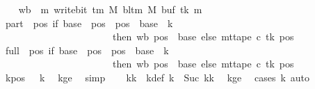 \begin{isabellebody}
\ \ \isamarkupfalse%
\ {\isacharquery}{\kern0pt}wb\ {\isacharequal}{\kern0pt}\ {\isachardoublequoteopen}{\isasymlambda}m{\isachardot}{\kern0pt}\ write{\isacharunderscore}{\kern0pt}bit\ {\isacharparenleft}{\kern0pt}{\isasymGamma}{\isacharunderscore}{\kern0pt}tm\ M{\isacharparenright}{\kern0pt}\ {\isacharparenleft}{\kern0pt}bl{\isacharunderscore}{\kern0pt}tm\ M{\isacharparenright}{\kern0pt}\ {\isacharparenleft}{\kern0pt}buf\ tk{\isacharparenright}{\kern0pt}\ m{\isachardoublequoteclose}\isanewline
\ \ \isamarkupfalse%
\ {\isacharquery}{\kern0pt}part\ {\isacharequal}{\kern0pt}\ {\isachardoublequoteopen}{\isasymlambda}pos{\isachardot}{\kern0pt}\ if\ base\ {\isasymle}\ pos\ {\isasymand}\ pos\ {\isacharless}{\kern0pt}\ base\ {\isacharplus}{\kern0pt}\ {\isacharparenleft}{\kern0pt}{\isacharquery}{\kern0pt}k\ {\isacharminus}{\kern0pt}\ {}{\isacharparenright}{\kern0pt}\isanewline
\ \ \ \ \ \ \ \ \ \ \ \ \ \ \ \ \ \ \ \ \ \ \ then\ {\isacharquery}{\kern0pt}wb\ {\isacharparenleft}{\kern0pt}pos\ {\isacharminus}{\kern0pt}\ base{\isacharparenright}{\kern0pt}\ else\ mt{\isacharunderscore}{\kern0pt}tape\ c{\isacharprime}{\kern0pt}\ tk\ pos{\isachardoublequoteclose}\isanewline
\ \ \isamarkupfalse%
\ {\isacharquery}{\kern0pt}full\ {\isacharequal}{\kern0pt}\ {\isachardoublequoteopen}{\isasymlambda}pos{\isachardot}{\kern0pt}\ if\ base\ {\isasymle}\ pos\ {\isasymand}\ pos\ {\isacharless}{\kern0pt}\ base\ {\isacharplus}{\kern0pt}\ {\isacharquery}{\kern0pt}k\isanewline
\ \ \ \ \ \ \ \ \ \ \ \ \ \ \ \ \ \ \ \ \ \ \ then\ {\isacharquery}{\kern0pt}wb\ {\isacharparenleft}{\kern0pt}pos\ {\isacharminus}{\kern0pt}\ base{\isacharparenright}{\kern0pt}\ else\ mt{\isacharunderscore}{\kern0pt}tape\ c{\isacharprime}{\kern0pt}\ tk\ pos{\isachardoublequoteclose}\isanewline
\ \ \isamarkupfalse%
\ kpos{\isacharcolon}{\kern0pt}\ {\isachardoublequoteopen}{}\ {\isacharless}{\kern0pt}\ {\isacharquery}{\kern0pt}k{\isachardoublequoteclose}\ \isamarkupfalse%
\ kge{}\ \isamarkupfalse%
\ simp\isanewline
\ \ \isamarkupfalse%
\ kk\ \ kdef{\isacharcolon}{\kern0pt}\ {\isachardoublequoteopen}{\isacharquery}{\kern0pt}k\ {\isacharequal}{\kern0pt}\ Suc\ kk{\isachardoublequoteclose}\ \isamarkupfalse%
\ kge{}\ \isamarkupfalse%
\ {\isacharparenleft}{\kern0pt}cases\ {\isacharquery}{\kern0pt}k{\isacharparenright}{\kern0pt}\ auto\isanewline
\ \ \isamarkupfalse%

\end{isabellebody}
